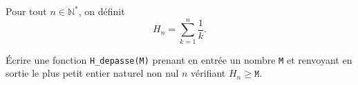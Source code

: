 \exer{}
\setcounter{numques}{0}

Pour tout $n\in\mathbb{N}^\ast$, on définit
\begin{equation*}
  H_n = \sum_{k=1}^n \dfrac{1}{k}.
\end{equation*}

\bigskip{}

\question{} Écrire une fonction \texttt{H\_depasse(M)} prenant en entrée un nombre \texttt{M} et renvoyant en sortie le plus petit entier naturel non nul $n$ vérifiant $H_n \geq \texttt{M}$. 